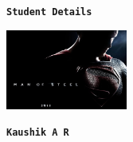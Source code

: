 \documentclass[a4paper]{article}
\begin{document}
\begin{center}
    \texttt{\Large\textbf{Student Details}}
    
    \vspace{0.5cm}
    \includegraphics[width=0.3\textwidth]{temp/student-passport-photo.jpg}
    
    \vspace{0.5cm}
    \texttt{\large\textbf{Kaushik A R}}
\end{center}

\vspace{1cm}
\end{document}
